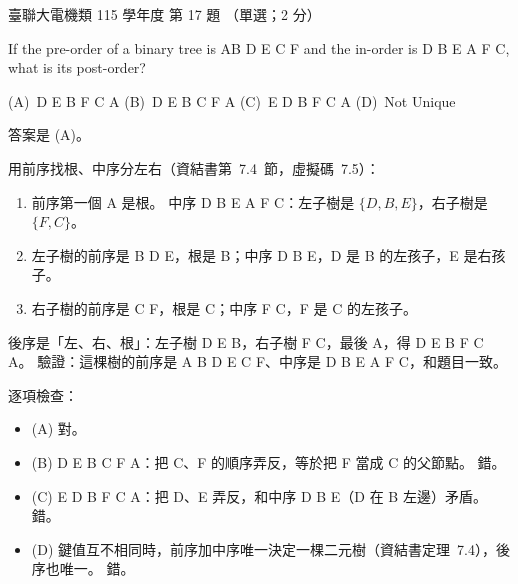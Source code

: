 \begin{pastexam}[label={px:ust-115-ee-ds-17}]{臺聯大電機類 115 學年度 第 17 題}
（單選；2 分）

If the pre-order of a binary tree is AB D E C F and the in-order is D B E A F C, what is its
post-order?

(A)~D E B F C A \qquad (B)~D E B C F A \qquad (C)~E D B F C A \qquad (D)~Not Unique
\end{pastexam}

\begin{pastsoln}
答案是 (A)。

用前序找根、中序分左右（資結書第~7.4~節，虛擬碼~7.5）：
\begin{enumerate}
\item 前序第一個 A 是根。 中序 D B E \textbar{} A \textbar{} F C：左子樹是 $\{D, B, E\}$，右子樹是
$\{F, C\}$。
\item 左子樹的前序是 B D E，根是 B；中序 D \textbar{} B \textbar{} E，D 是 B 的左孩子，E 是右孩子。
\item 右子樹的前序是 C F，根是 C；中序 F \textbar{} C，F 是 C 的左孩子。
\end{enumerate}
\begin{center}
\end{center}
後序是「左、右、根」：左子樹 D E B，右子樹 F C，最後 A，得 D E B F C A。
驗證：這棵樹的前序是 A B D E C F、中序是 D B E A F C，和題目一致。

逐項檢查：
\begin{itemize}
\item (A) 對。
\item (B) D E B C F A：把 C、F 的順序弄反，等於把 F 當成 C 的父節點。 錯。
\item (C) E D B F C A：把 D、E 弄反，和中序 D B E（D 在 B 左邊）矛盾。 錯。
\item (D) 鍵值互不相同時，前序加中序唯一決定一棵二元樹（資結書定理~7.4），後序也唯一。 錯。
\end{itemize}
\end{pastsoln}
